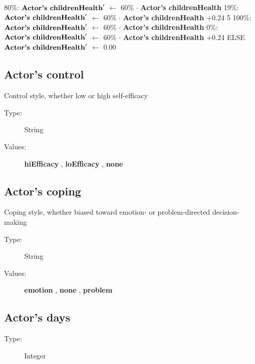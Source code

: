 \documentclass{article}%
\begin{document}
\begin{flushleft}
\hspace*{6em}%
80\%: %
$\mbox{\textbf{Actor's childrenHealth}} '$%
$\leftarrow$%
60\%%
$\cdot$%
\textbf{Actor's childrenHealth}%
\linebreak%
\hspace*{6em}%
19\%: %
$\mbox{\textbf{Actor's childrenHealth}} '$%
$\leftarrow$%
60\%%
$\cdot$%
\textbf{Actor's childrenHealth}%
+0.24%
\linebreak%
\hspace*{4em}%
5 %
\linebreak%
\hspace*{6em}%
100\%: %
$\mbox{\textbf{Actor's childrenHealth}} '$%
$\leftarrow$%
60\%%
$\cdot$%
\textbf{Actor's childrenHealth}%
\linebreak%
\hspace*{6em}%
0\%: %
$\mbox{\textbf{Actor's childrenHealth}} '$%
$\leftarrow$%
60\%%
$\cdot$%
\textbf{Actor's childrenHealth}%
+0.24%
\linebreak%
\hspace*{2em}%
ELSE %
$\mbox{\textbf{Actor's childrenHealth}} '$%
$\leftarrow$%
0.00%
\end{flushleft}

%
\subsection{Actor's control}%
\label{subsec:Actor's control}%
Control style, whether low or high self{-}efficacy%
\begin{description}%
\item[Type:]%
String%
\item[Values:]%
\textbf{hiEfficacy}%
, %
\textbf{loEfficacy}%
, %
\textbf{none}%
\end{description}

%
\subsection{Actor's coping}%
\label{subsec:Actor's coping}%
Coping style, whether biased toward emotion{-} or problem{-}directed decision{-}making%
\begin{description}%
\item[Type:]%
String%
\item[Values:]%
\textbf{emotion}%
, %
\textbf{none}%
, %
\textbf{problem}%
\end{description}

%
\subsection{Actor's days}%
\label{subsec:Actor's days}%
\begin{description}%
\item[Type:]%
Integer%
\end{description}
\end{document}
